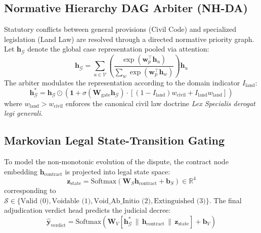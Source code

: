 \documentclass[11pt,a4paper]{article}
\begin{document}
\subsection{Normative Hierarchy DAG Arbiter (NH-DA)}
Statutory conflicts between general provisions (Civil Code) and specialized legislation (Land Law) are resolved through a directed normative priority graph. Let $\mathbf{h}_{\mathcal{G}}$ denote the global case representation pooled via attention:
\begin{equation}
\mathbf{h}_{\mathcal{G}} = \sum_{u \in \mathcal{V}} \left( \frac{\exp(\mathbf{w}_p^\top \mathbf{h}_u)}{\sum_{w} \exp(\mathbf{w}_p^\top \mathbf{h}_w)} \right) \mathbf{h}_u
\end{equation}
The arbiter modulates the representation according to the domain indicator $I_{\text{land}}$:
\begin{equation}
\mathbf{h}_{\mathcal{G}}^* = \mathbf{h}_{\mathcal{G}} \odot \left( \mathbf{1} + \sigma(\mathbf{W}_{\text{gate}} \mathbf{h}_{\mathcal{G}}) \cdot \left[ (1 - I_{\text{land}}) w_{\text{civil}} + I_{\text{land}} w_{\text{land}} \right] \right)
\end{equation}
where $w_{\text{land}} > w_{\text{civil}}$ enforces the canonical civil law doctrine \textit{Lex Specialis derogat legi generali}.

\subsection{Markovian Legal State-Transition Gating}
To model the non-monotonic evolution of the dispute, the contract node embedding $\mathbf{h}_{\text{contract}}$ is projected into legal state space:
\begin{equation}
\mathbf{z}_{\text{state}} = \text{Softmax}(\mathbf{W}_S \mathbf{h}_{\text{contract}} + \mathbf{b}_S) \in \mathbb{R}^4
\end{equation}
corresponding to $\mathcal{S} \in \{\text{Valid (0)}, \text{Voidable (1)}, \text{Void\_Ab\_Initio (2)}, \text{Extinguished (3)}\}$. The final adjudication verdict head predicts the judicial decree:
\begin{equation}
\hat{\mathbf{y}}_{\text{verdict}} = \text{Softmax}\left( \mathbf{W}_V [\mathbf{h}_{\mathcal{G}}^* \,\|\, \mathbf{h}_{\text{contract}} \,\|\, \mathbf{z}_{\text{state}}] + \mathbf{b}_V \right)
\end{equation}
\end{document}
